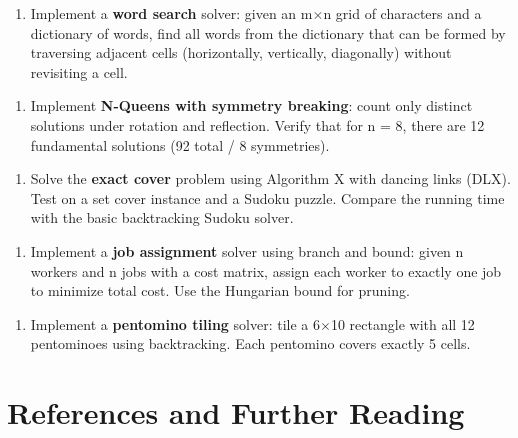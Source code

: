\begin{enumerate}
\item Implement a \textbf{word search} solver: given an m$\times $n grid of characters and a dictionary of words, find all words from the dictionary that can be formed by traversing adjacent cells (horizontally, vertically, diagonally) without revisiting a cell.
\end{enumerate}

\begin{enumerate}
\item Implement \textbf{N-Queens with symmetry breaking}: count only distinct solutions under rotation and reflection. Verify that for n = 8, there are 12 fundamental solutions (92 total / 8 symmetries).
\end{enumerate}

\begin{enumerate}
\item Solve the \textbf{exact cover} problem using Algorithm X with dancing links (DLX). Test on a set cover instance and a Sudoku puzzle. Compare the running time with the basic backtracking Sudoku solver.
\end{enumerate}

\begin{enumerate}
\item Implement a \textbf{job assignment} solver using branch and bound: given n workers and n jobs with a cost matrix, assign each worker to exactly one job to minimize total cost. Use the Hungarian bound for pruning.
\end{enumerate}

\begin{enumerate}
\item Implement a \textbf{pentomino tiling} solver: tile a 6$\times $10 rectangle with all 12 pentominoes using backtracking. Each pentomino covers exactly 5 cells.
\end{enumerate}

\section{References and Further Reading}


